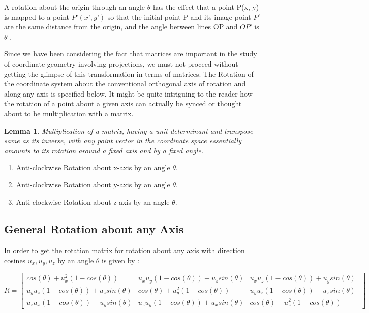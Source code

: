 \documentclass[12pt]{report}
\newtheorem{lemma}[theorem]{Lemma}
\begin{document}
A rotation about the origin through an angle $ \theta$ has the effect that a point P(x, y) is mapped to a point $ P’ (x’ , y’) $ so that the initial point P and its image point $ P' $ are the same distance from the origin, and the angle between lines OP and $ OP’ $ is $ \theta $ .
\vspace{0.3cm}

\hspace{1cm} Since we have been considering the fact that matrices are important in the study of coordinate geometry involving projections, we must not proceed without getting the glimpse of this transformation in terms of matrices. The Rotation of the coordinate system about the conventional orthogonal axis of rotation and along any axis is specified below.
\vspace{0.3cm}
It might be quite intriguing to the reader how the rotation of a point about a given axis can actually be synced or thought about to be multiplication with a matrix. 

\begin{lemma}
  Multiplication of a matrix, having a unit determinant and transpose same as its inverse, with any point vector in the coordinate space essentially amounts to its rotation around a fixed axis and by a fixed angle.
\end{lemma}

\begin{enumerate}
  \item Anti-clockwise Rotation about x-axis by an angle $\theta$.
  \item Anti-clockwise Rotation about y-axis by an angle $\theta$. 
  \item Anti-clockwise Rotation about z-axis by an angle $\theta$. 
\end{enumerate}

\subsection{General Rotation about any Axis}


In order to get the rotation matrix for rotation about any axis with direction cosines $ u_{x}, u_{y},u_{z}  $ by an angle $\theta$ is given by : 
\begin{changemargin}{-1.2cm}{0cm} 
\[ R =  \begin{bmatrix}
cos(\theta) + u_{x}^2(1-cos(\theta)) & u_{x}u_{y}(1-cos(\theta)) - u_{z}sin(\theta) &  u_{x}u_{z}(1-cos(\theta)) + u_{y}sin(\theta) \\
u_{y}u_{z}(1-cos(\theta)) + u_{z}sin(\theta) & cos(\theta) + u_{y}^2(1-cos(\theta)) &  u_{y}u_{z}(1-cos(\theta)) - u_{x}sin(\theta) \\
u_{z}u_{x}(1-cos(\theta)) - u_{y}sin(\theta) & u_{z}u_{y}(1-cos(\theta)) + u_{x}sin(\theta) & cos(\theta) + u_{z}^2(1-cos(\theta)) 
\hspace{1cm}
\end{bmatrix}\]
\end{changemargin}
\end{document}

